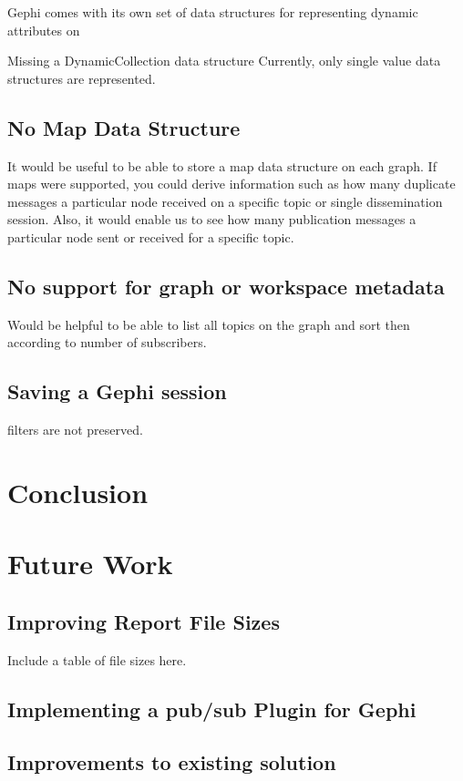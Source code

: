 Gephi comes with its own set of data structures for representing
dynamic attributes on

Missing a DynamicCollection data structure Currently, only single value
data structures are represented.

\subsection{No Map Data Structure}
It would be useful to be able to store a map data structure on each
graph. If maps were supported, you could derive information such as how
many duplicate messages a particular node received on a specific topic
or single dissemination session. Also, it would enable us to see how
many publication messages a particular node sent or received for a
specific topic.

\subsection{No support for graph or workspace metadata}
Would be helpful to be able to list all topics on the graph and sort
then according to number of subscribers.

\subsection{Saving a Gephi session}
filters are not preserved.

\section{Conclusion}
\section{Future Work}
\subsection{Improving Report File Sizes}
Include a table of \gexf{} file sizes here.

\subsection{Implementing a pub/sub Plugin for Gephi}
\subsection{Improvements to existing solution}
